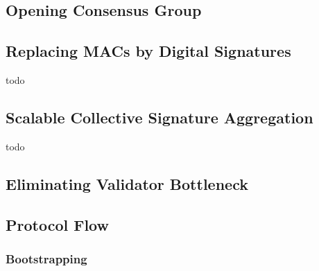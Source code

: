 \subsection{Opening Consensus Group}\label{subsec:opening-consensus-group-and-leaders}


\subsection{Replacing MACs by Digital Signatures}\label{subsec:replacing-macs-by-digital-signatures}

todo

\subsection{Scalable Collective Signature Aggregation}\label{subsec:scalable-collective-signature-aggregation}

todo

\subsection{Eliminating Validator Bottleneck}\label{subsec:eliminating-validator-bottleneck}


\subsection{Protocol Flow}\label{subsec:protocol-flow}

\subsubsection{Bootstrapping}\label{subsubsec:bootstrapping}

